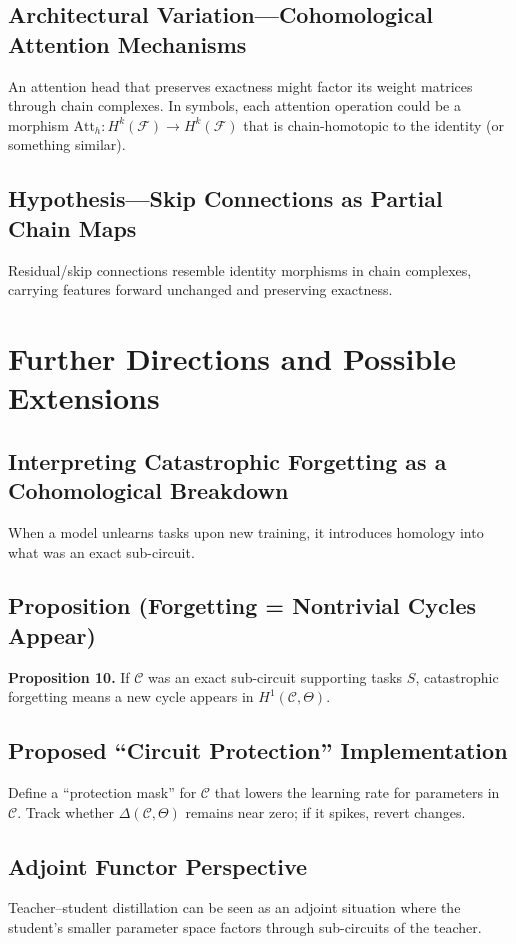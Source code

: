 \documentclass{article}
\begin{document}
\subsection{Architectural Variation—Cohomological Attention Mechanisms}
An attention head that preserves exactness might factor its weight matrices through chain complexes. In symbols, each attention operation could be a morphism $\mathrm{Att}_h: H^k(\mathcal{F}) \to H^k(\mathcal{F})$ that is chain-homotopic to the identity (or something similar).

\subsection{Hypothesis—Skip Connections as Partial Chain Maps}
Residual/skip connections resemble identity morphisms in chain complexes, carrying features forward unchanged and preserving exactness.

\section{Further Directions and Possible Extensions}

\subsection{Interpreting Catastrophic Forgetting as a Cohomological Breakdown}
When a model unlearns tasks upon new training, it introduces homology into what was an exact sub-circuit.

\subsection{Proposition (Forgetting = Nontrivial Cycles Appear)}
\textbf{Proposition 10.}  
If $\mathcal{C}$ was an exact sub-circuit supporting tasks $S$, catastrophic forgetting means a new cycle appears in $H^1(\mathcal{C}, \Theta)$.

\subsection{Proposed “Circuit Protection” Implementation}
Define a “protection mask” for $\mathcal{C}$ that lowers the learning rate for parameters in $\mathcal{C}$. Track whether $\Delta(\mathcal{C}, \Theta)$ remains near zero; if it spikes, revert changes.

\subsection{Adjoint Functor Perspective}
Teacher–student distillation can be seen as an adjoint situation where the student’s smaller parameter space factors through sub-circuits of the teacher.
\end{document}
